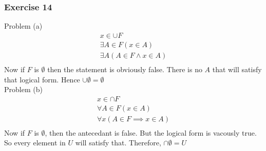 \begin{questions}
\subsubsection{Exercise 14}
Problem (a)
\begin{align*}
  x \in \cup F \\
  \exists A \in F(x \in A)  \\
  \exists A (A \in F \land x \in A) \\
\end{align*}
Now if $F$ is $\emptyset$ then the statement is obviously false. There
is no $A$ that will satisfy that logical form. Hence $\cup \emptyset =
\emptyset$ \\

Problem (b)
\begin{align*}
  x \in \cap F \\
  \forall A \in F(x \in A) \\
  \forall x (A \in F \implies x \in A) \\
\end{align*}
Now if $F$ is $\emptyset$, then the antecedant is false. But the
logical form is vacously true. So every element in $U$ will satisfy
that. Therefore, $\cap \emptyset = U$

\end{questions}